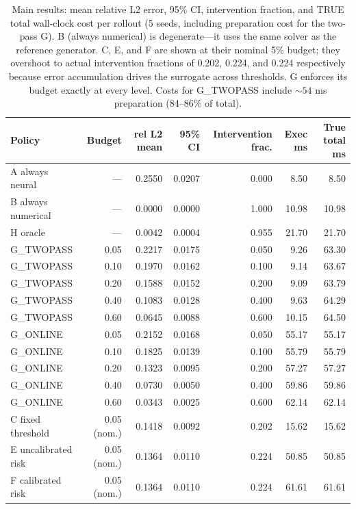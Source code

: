 \documentclass[11pt]{article}
\begin{document}
\begin{table}[h]
\centering
\caption{Main results: mean relative L2 error, 95\% CI, intervention fraction, and TRUE total wall-clock cost per rollout (5 seeds, including preparation cost for the two-pass G). B (always numerical) is degenerate---it uses the same solver as the reference generator. C, E, and F are shown at their nominal 5\% budget; they overshoot to actual intervention fractions of 0.202, 0.224, and 0.224 respectively because error accumulation drives the surrogate across thresholds. G enforces its budget exactly at every level. Costs for G\_TWOPASS include $\sim 54$ ms preparation (84--86\% of total).}
\label{tab:summary}
\begin{tabular}{lrrrrrr}
\toprule
Policy & Budget & rel L2 mean & 95\% CI & Intervention frac. & Exec ms & True total ms \\
\midrule
A always neural & --- & 0.2550 & 0.0207 & 0.000 & 8.50 & 8.50 \\
B always numerical & --- & 0.0000 & 0.0000 & 1.000 & 10.98 & 10.98 \\
H oracle & --- & 0.0042 & 0.0004 & 0.955 & 21.70 & 21.70 \\
\midrule
G\_TWOPASS & 0.05 & 0.2217 & 0.0175 & 0.050 & 9.26 & 63.30 \\
G\_TWOPASS & 0.10 & 0.1970 & 0.0162 & 0.100 & 9.14 & 63.67 \\
G\_TWOPASS & 0.20 & 0.1588 & 0.0152 & 0.200 & 9.09 & 63.79 \\
G\_TWOPASS & 0.40 & 0.1083 & 0.0128 & 0.400 & 9.63 & 64.29 \\
G\_TWOPASS & 0.60 & 0.0645 & 0.0088 & 0.600 & 10.15 & 64.50 \\
\midrule
G\_ONLINE & 0.05 & 0.2152 & 0.0168 & 0.050 & 55.17 & 55.17 \\
G\_ONLINE & 0.10 & 0.1825 & 0.0139 & 0.100 & 55.79 & 55.79 \\
G\_ONLINE & 0.20 & 0.1323 & 0.0095 & 0.200 & 57.27 & 57.27 \\
G\_ONLINE & 0.40 & 0.0730 & 0.0050 & 0.400 & 59.86 & 59.86 \\
G\_ONLINE & 0.60 & 0.0343 & 0.0025 & 0.600 & 62.14 & 62.14 \\
\midrule
C fixed threshold & 0.05 (nom.) & 0.1418 & 0.0092 & 0.202 & 15.62 & 15.62 \\
E uncalibrated risk & 0.05 (nom.) & 0.1364 & 0.0110 & 0.224 & 50.85 & 50.85 \\
F calibrated risk & 0.05 (nom.) & 0.1364 & 0.0110 & 0.224 & 61.61 & 61.61 \\
\bottomrule
\end{tabular}
\end{table}
\end{document}
